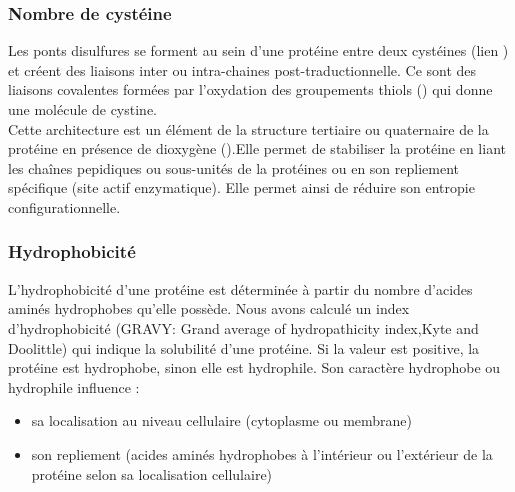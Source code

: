\subsubsection*{Nombre de cystéine}
Les ponts disulfures se forment au sein d'une protéine entre deux cystéines (lien ) et créent des liaisons inter ou intra-chaines post-traductionnelle. Ce sont des liaisons covalentes formées par l'oxydation des groupements thiols () qui donne une molécule de cystine.\\
Cette architecture est un élément de la structure tertiaire ou quaternaire de la protéine en présence de dioxygène ().Elle permet de stabiliser la protéine en liant les chaînes pepidiques ou sous-unités de la protéines ou en  son repliement spécifique (site actif enzymatique). Elle permet ainsi de réduire son entropie configurationnelle.
\\

\subsubsection*{Hydrophobicité}
L'hydrophobicité d'une protéine est déterminée à partir du nombre d'acides aminés hydrophobes qu'elle possède.
Nous avons calculé un index d'hydrophobicité (GRAVY: Grand average of hydropathicity index,Kyte and Doolittle) qui indique la solubilité d'une protéine. Si la valeur est positive, la protéine est hydrophobe, sinon elle est hydrophile.
Son caractère hydrophobe ou hydrophile influence :
\begin{itemize}
\item sa localisation au niveau cellulaire (cytoplasme ou membrane)
\item son repliement (acides aminés hydrophobes à l'intérieur ou l'extérieur de la protéine selon sa localisation cellulaire) \\
\end{itemize}


